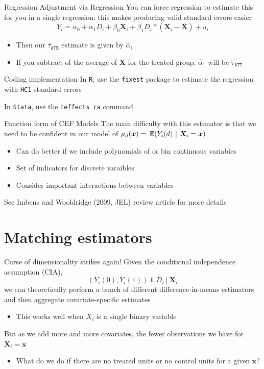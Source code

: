 \documentclass[aspectratio=169,t,11pt,table]{beamer}
\begin{document}
\begin{frame}{Regression Adjustment via Regression}
  You can force regression to estimate this for you in a single regression; this makes producing valid standard errors easier
  $$
    Y_i = \alpha_0 + \alpha_1 D_i + \beta_0 \bm{X}_i + \beta_1 D_i * (\bm{X}_i - \bar{\bm{X}}) + u_i
  $$
  \begin{itemize}
    \item Then our $\hat{\tau}_{\texttt{ATE}}$ estimate is given by $\hat{\alpha}_1$
    \item If you subtract of the average of $\bm{X}$ for the treated group, $\hat{\alpha}_1$ will be $\hat{\tau}_{\texttt{ATT}}$
  \end{itemize}
\end{frame}

\begin{frame}{Coding implementation}
  In \texttt{R}, use the \texttt{fixest} package to estimate the regression with \texttt{HC1} standard errors

  \bigskip
  In \texttt{Stata}, use the \texttt{teffects ra} command
\end{frame}

\begin{frame}{Function form of CEF Models}
  The main difficulty with this estimator is that we need to be confident in our model of $\mu_d(\bm{x}) = \expec{Y_i(d)}{\bm{X}_i = \bm{x}}$
  \begin{itemize}
    \item Can do better if we include polynomials of or bin continuous variables 
    \item Set of indicators for discrete varaibles
    \item Consider important interactions between variables
  \end{itemize}

  \bigskip
  See Imbens and Wooldridge (2009, JEL) review article for more details
\end{frame}

\section{Matching estimators}

\begin{frame}{Curse of dimensionality strikes again!}
  Given the conditional independence assumption (CIA), 
  $$
    (Y_{i}(0), Y_{i}(1)) \Perp D_i \ \vert \ \bm{X}_i
  $$
  we can theoretically perform a bunch of different difference-in-means estimators and then aggregate covariate-specific estimates
  \begin{itemize}
    \item This works well when $X_i$ is a single binary variable
  \end{itemize}

  \pause
  \bigskip
  But as we add more and more covariates, the fewer observations we have for $\bm{X}_i = \bm{x}$
  \begin{itemize}
    \item What do we do if there are no treated units or no control units for a given $\bm{x}$?
  \end{itemize}
\end{frame}
\end{document}
